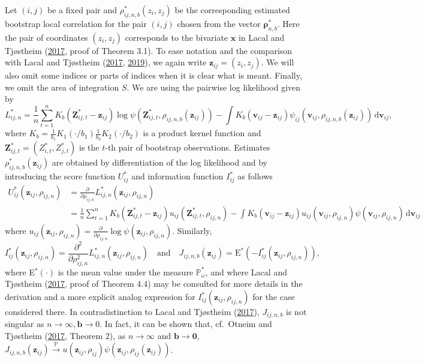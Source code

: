 \documentclass[
  12pt,
  letterpaper]{article}
\numberwithin{equation}{section}
\newcommand{\x}{\bm{x}}
\newcommand{\Z}{\bm{Z}}
\newcommand{\z}{\bm{z}}
\newcommand{\fv}{\bm{v}}
\newcommand{\frho}{\bm{\rho}}
\newcommand{\bb}{\bm{b}}
\newcommand{\E}{\textrm{E}}
\newcommand{\di}{\,\textrm{d}}
\begin{document}
Let \((i,j)\) be a fixed pair and \(\rho_{ij,n,b}^*(z_i,z_j)\) be the corresponding estimated bootstrap local correlation for the pair \((i,j)\) chosen from the vector \(\frho_{n,b}^*\). Here the pair of coordinates \((z_i,z_j)\) corresponds to the bivariate \(\x\) in Lacal and Tjøstheim (\protect\hyperlink{ref-lacal2017local}{2017}, proof of Theorem 3.1). To ease notation and the comparison with Lacal and Tjøstheim (\protect\hyperlink{ref-lacal2017local}{2017}, \protect\hyperlink{ref-lacal2018estimating}{2019}), we again write \(\z_{ij} = (z_i,z_j)\). We will also omit some indices or parts of indices when it is clear what is meant. Finally, we omit the area of integration \(S\). We are using the pairwise log likelihood given by
\[
L_{ij,n}^* = \frac{1}{n} \sum_{t=1}^{n} K_b(\Z_{ij,t}^{*}-\z_{ij}) \log \psi(\Z_{ij,t}^{*},\rho_{ij,n,b}(\z_{ij})) - \int K_b(\fv_{ij}-\z_{ij}) \psi_{ij}(\fv_{ij},\rho_{ij,n,b}(\z_{ij})) \di \fv_{ij},
\]
where \(K_b = \frac{1}{b_1}K_1(\cdot/b_1) \frac{1}{b_2} K_2(\cdot/b_2)\) is a product kernel function and \(\Z_{ij,t}^{*} = \left(Z_{i,t}^{*},Z_{j,t}^{*}\right)\) is the \(t\)-th pair of bootstrap observations. Estimates \(\rho_{ij,n,b}^*(\z_{ij})\) are obtained by differentiation of the log likelihood and by introducing the score function \(U_{ij}^*\) and information function \(I_{ij}^*\) as follows
\begin{align*}
U_{ij}^*(\z_{ij},\rho_{ij,n}) &= \frac{\partial}{\partial \rho_{ij,n}}L_{ij,n}^*(\z_{ij},\rho_{ij,n}) \\
& = \frac{1}{n}\sum_{t=1}^{n}K_b(\Z_{ij,t}^{*} - \z_{ij})u_{ij}(\Z_{ij,t}^{*},\rho_{ij,n}) - 
\int K_b(\fv_{ij} - \z_{ij})u_{ij}(\fv_{ij},\rho_{ij,n})\psi(\fv_{ij},\rho_{ij,n}) \di \fv_{ij}
\end{align*}
where \(u_{ij}(\z_{ij},\rho_{ij,n}) = \frac{\partial}{\partial \rho_{ij,n}}\log \psi(\z_{ij},\rho_{ij,n})\). Similarly,
\[
I_{ij}^*(\z_{ij},\rho_{ij,n}) = \frac{\partial^2}{\partial \rho_{ij,n}^2} L_{ij,n}^{*}(\z_{ij},\rho_{ij,n}) \quad \mbox{and} \quad J_{ij,n,b}(\z_{ij}) = \E^*\left(-I_{ij}^*(\z_{ij},\rho_{ij,n})\right),
\]
where E\(^*(\cdot)\) is the mean value under the measure \(\mathbb{P}^*_{\omega}\), and where Lacal and Tjøstheim (\protect\hyperlink{ref-lacal2017local}{2017}, proof of Theorem 4.4) may be consulted for more details in the derivation and a more explicit analog expression for \(I_{ij}^*(\z_{ij},\rho_{ij,n})\) for the case considered there. In contradistinction to Lacal and Tjøstheim (\protect\hyperlink{ref-lacal2017local}{2017}), \(J_{ij,n,b}\) is not singular as \(n\to \infty, \bb \to 0\). In fact, it can be shown that, cf.~Otneim and Tjøstheim (\protect\hyperlink{ref-otneim2017locally}{2017}, Theorem 2), as \(n \to \infty\) and \(\bb \to \bm{0}\), \(J_{ij,n,b}(\z_{ij}) \stackrel{\mathbb{P}}{\to} u(\z_{ij},\rho_{ij})\psi(\z_{ij},\rho_{ij}(\z_{ij}))\).
\end{document}
